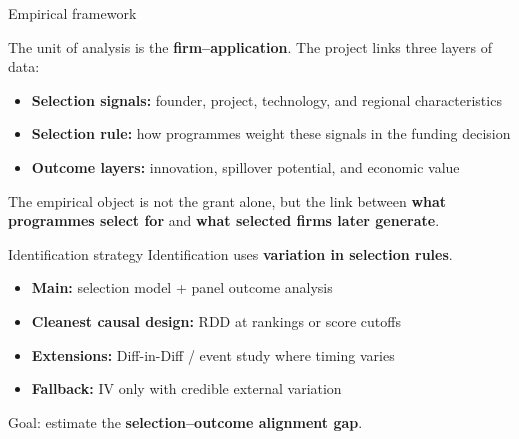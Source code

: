 \documentclass[aspectratio=169]{beamer}
\newcommand{\highlight}[1]{\textcolor{VeronaBlue}{\textbf{#1}}}
\begin{document}
\begin{frame}{Empirical framework}
  \begin{center}
  \end{center}

  The unit of analysis is the \highlight{firm--application}. The project links three layers of data:
  \vspace{0.15cm}
  \begin{itemize} \small
    \item \highlight{Selection signals:} founder, project, technology, and regional characteristics
    \item \highlight{Selection rule:} how programmes weight these signals in the funding decision
    \item \highlight{Outcome layers:} innovation, spillover potential, and economic value
  \end{itemize}
  \vspace{0.15cm}

  \vspace{0.15cm}
  \small The empirical object is not the grant alone, but the link between \highlight{what programmes select for} and \highlight{what selected firms later generate}.
\end{frame}

\begin{frame}{Identification strategy}
  \large
  Identification uses \highlight{variation in selection rules}.
  \vspace{0.35cm}
  \normalsize
  \begin{itemize}
    \item \highlight{Main:} selection model + panel outcome analysis
    \item \highlight{Cleanest causal design:} RDD at rankings or score cutoffs
    \item \highlight{Extensions:} Diff-in-Diff / event study where timing varies
    \item \highlight{Fallback:} IV only with credible external variation
  \end{itemize}
  \vspace{0.25cm}
  \small
  Goal: estimate the \highlight{selection--outcome alignment gap}.
\end{frame}
\end{document}
